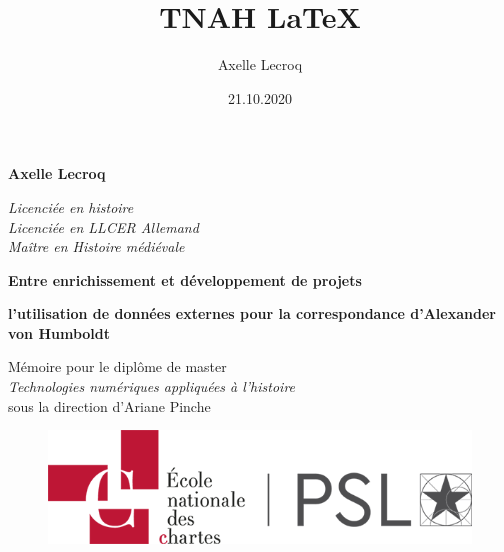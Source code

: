 \documentclass[a4paper, 12pt, twoside]{book}
\author{Axelle Lecroq}
\title{TNAH \LaTeX}
\date{21.10.2020}
\begin{document}
\onehalfspacing 
\frontmatter
\begin{titlepage}
		\begin{center}
			
			\bigskip
			\bigskip
			\bigskip
			\bigskip
			\bigskip
			\begin{Large}
				\textbf{Axelle Lecroq}\\
			\end{Large}
			\begin{normalsize} \textit{Licenciée en histoire}\\
			\textit{Licenciée en LLCER Allemand}\\
			\textit{Maître en Histoire médiévale}
			\end{normalsize}
			
			\bigskip
			\bigskip
			\bigskip
			
			\begin{Huge}
				\textbf{Entre enrichissement et développement de projets }\\
			\end{Huge}
			\bigskip
			\bigskip
			\begin{LARGE}
				\textbf{l'utilisation de données externes pour la correspondance d'Alexander von Humboldt}\\
			\end{LARGE}
			
			\bigskip
			\begin{large}
			\end{large}
			\vfill
			
			\begin{large}
			
				Mémoire 
				pour le diplôme de master \\
				\textit{Technologies numériques appliquées à l'histoire} \\
				sous la direction d'Ariane Pinche \\
			\end{large}
			\begin{figure}[h]
                \centering
                \includegraphics[scale=0.3]{img/logo_ENC.png}
                \hfill
            \end{figure}
			
		\end{center}
	\end{titlepage}
\end{document}
